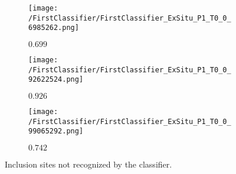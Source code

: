 \begin{figure}[H]
\centering
\begin{subfigure}{.3\textwidth}
\texttt{[image: /FirstClassifier/FirstClassifier\_ExSitu\_P1\_T0\_0\_6985262.png]}
\caption{$0.699$}
\label{sub:IncAsRest_1}
\end{subfigure}
\centering
\begin{subfigure}{.3\textwidth}
\texttt{[image: /FirstClassifier/FirstClassifier\_ExSitu\_P1\_T0\_0\_92622524.png]}
\caption{$0.926$}
\label{sub:IncAsRest_2}
\end{subfigure}
\centering
\begin{subfigure}{.3\textwidth}
\texttt{[image: /FirstClassifier/FirstClassifier\_ExSitu\_P1\_T0\_0\_99065292.png]}
\caption{$0.742$}
\label{sub:IncAsRest_3}
\end{subfigure}
\caption{Inclusion sites not recognized by the classifier.}
\label{fig:InceptionExSituPredictedRestTrueInc}

\end{figure}



